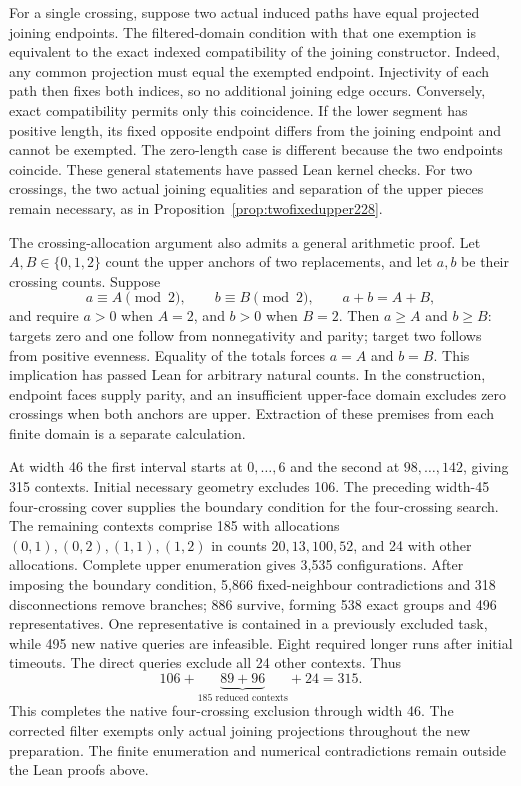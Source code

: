\documentclass[11pt,a4paper]{article}
\theoremstyle{definition}
\theoremstyle{remark}
\begin{document}
For a single crossing, suppose two actual induced paths have equal
projected joining endpoints. The filtered-domain condition with that
one exemption is equivalent to the exact indexed compatibility of the
joining constructor. Indeed, any common projection must equal the
exempted endpoint. Injectivity of each path then fixes both indices,
so no additional joining edge occurs. Conversely, exact compatibility
permits only this coincidence. If the lower segment has positive length,
its fixed opposite endpoint differs from the joining endpoint and cannot
be exempted. The zero-length case is different because the two endpoints
coincide. These general statements have passed Lean kernel checks.
For two crossings, the two actual joining equalities and separation of
the upper pieces remain necessary, as in Proposition~\ref{prop:twofixedupper228}.

The crossing-allocation argument also admits a general arithmetic proof.
Let $A,B\in\{0,1,2\}$ count the upper anchors of two replacements, and let
$a,b$ be their crossing counts. Suppose
\[
a\equiv A\pmod2,\qquad b\equiv B\pmod2,
\qquad a+b=A+B,
\]
and require $a>0$ when $A=2$, and $b>0$ when $B=2$.
Then $a\ge A$ and $b\ge B$: targets zero and one follow from
nonnegativity and parity; target two follows from positive evenness.
Equality of the totals forces $a=A$ and $b=B$. This implication has
passed Lean for arbitrary natural counts. In the construction, endpoint
faces supply parity, and an insufficient upper-face domain excludes
zero crossings when both anchors are upper. Extraction of these premises
from each finite domain is a separate calculation.

At width 46 the first interval starts at $0,\ldots,6$ and the second at
$98,\ldots,142$, giving 315 contexts. Initial necessary geometry excludes
106. The preceding width-45 four-crossing cover supplies the boundary
condition for the four-crossing search. The remaining contexts comprise
185 with allocations $(0,1),(0,2),(1,1),(1,2)$ in counts
$20,13,100,52$, and 24 with other allocations.
Complete upper enumeration gives 3,535 configurations. After imposing
the boundary condition, 5,866 fixed-neighbour contradictions and 318
disconnections remove branches; 886 survive, forming 538 exact groups
and 496 representatives. One representative is contained in a previously
excluded task, while 495 new native queries are infeasible. Eight required
longer runs after initial timeouts. The direct queries exclude all 24
other contexts. Thus
\[
106+\underbrace{89+96}_{185\text{ reduced contexts}}+24=315.
\]
This completes the native four-crossing exclusion through width 46.
The corrected filter exempts only actual joining projections throughout
the new preparation. The finite enumeration and numerical contradictions
remain outside the Lean proofs above.
\end{document}
